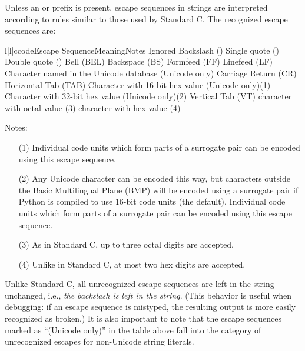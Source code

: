 Unless an  or  prefix is present, escape
sequences in strings are interpreted according to rules similar to
those used by Standard C.  The recognized escape sequences are:

\begin{tableiii}{l|l|c}{code}{Escape Sequence}{Meaning}{Notes}
 {Ignored}{}
\lineiii{\e\e}	{Backslash (\code{\e})}{}
	{Single quote ()}{}
	{Double quote ()}{}
	{\ASCII{} Bell (BEL)}{}
	{\ASCII{} Backspace (BS)}{}
	{\ASCII{} Formfeed (FF)}{}
	{\ASCII{} Linefeed (LF)}{}
        {Character named  in the Unicode database (Unicode only)}{}
	{\ASCII{} Carriage Return (CR)}{}
	{\ASCII{} Horizontal Tab (TAB)}{}
        {Character with 16-bit hex value  (Unicode only)}{(1)}
        {Character with 32-bit hex value  (Unicode only)}{(2)}
	{\ASCII{} Vertical Tab (VT)}{}
 {\ASCII{} character with octal value }{(3)}
 {\ASCII{} character with hex value }{(4)}
\end{tableiii}

\noindent
Notes:

\begin{itemize}
\item[(1)]
  Individual code units which form parts of a surrogate pair can be
  encoded using this escape sequence.
\item[(2)]
  Any Unicode character can be encoded this way, but characters
  outside the Basic Multilingual Plane (BMP) will be encoded using a
  surrogate pair if Python is compiled to use 16-bit code units (the
  default).  Individual code units which form parts of a surrogate
  pair can be encoded using this escape sequence.
\item[(3)]
  As in Standard C, up to three octal digits are accepted.
\item[(4)]
  Unlike in Standard C, at most two hex digits are accepted.
\end{itemize}


Unlike Standard C,
all unrecognized escape sequences are left in the string unchanged,
i.e., \emph{the backslash is left in the string}.  (This behavior is
useful when debugging: if an escape sequence is mistyped, the
resulting output is more easily recognized as broken.)  It is also
important to note that the escape sequences marked as ``(Unicode
only)'' in the table above fall into the category of unrecognized
escapes for non-Unicode string literals.

